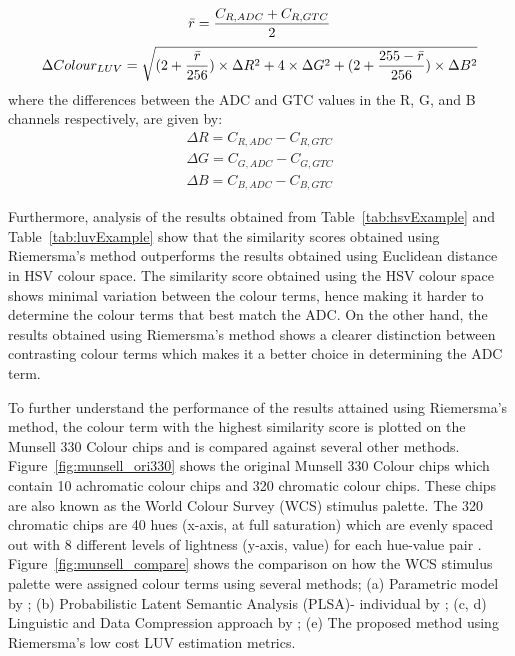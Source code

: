 \begin{equation}
\label{eq:RedMeanRGBDiff}
\bar{r} = \frac{C_{R,ADC} + C_{R,GTC}}{2}
\end{equation}
\begin{equation}
\label{eq:DiffColorLUV}
\Delta Colour_{LUV} = \sqrt{(2 + \frac{\bar{r}}{256}) \times \Delta R^{2} + 4 \times \Delta G^{2} + (2 + \frac{255 - \bar{r}}{256}) \times \Delta B^{2} }
\end{equation}
where the differences between the ADC and GTC values in the R, G, and B channels respectively, are given by:
\begin{align}
\Delta R = C_{R,ADC} - C_{R,GTC}\\
\Delta G = C_{G,ADC} - C_{G,GTC}\\
\Delta B = C_{B,ADC} - C_{B,GTC}
 \end{align}
 
Furthermore, analysis of the results obtained from Table~\ref{tab:hsvExample} and Table~\ref{tab:luvExample} show that the similarity scores obtained using Riemersma's method outperforms the results obtained using Euclidean distance in HSV colour space.
The similarity score obtained using the HSV colour space shows minimal variation between the colour terms, hence making it harder to determine the colour terms that best match the ADC.
On the other hand, the results obtained using Riemersma's method shows a clearer distinction between contrasting colour terms which makes it a better choice in determining the ADC term.

To further understand the performance of the results attained using Riemersma's method, the colour term with the highest similarity score is plotted on the Munsell 330 Colour chips and is compared against several other methods.
Figure~\ref{fig:munsell_ori330} shows the original Munsell 330 Colour chips which contain 10 achromatic colour chips and 320 chromatic colour chips.
These chips are also known as the World Colour Survey (WCS) stimulus palette.
The 320 chromatic chips are 40 hues (x-axis, at full saturation) which are evenly spaced out with 8 different levels of lightness (y-axis, value) for each hue-value pair \cite{kay2009world}.
Figure~\ref{fig:munsell_compare} shows the comparison on how the WCS stimulus palette were assigned colour terms using several methods; (a) Parametric model by ; (b) Probabilistic Latent Semantic Analysis (PLSA)- individual by ; (c, d) Linguistic and Data Compression approach by ; (e) The proposed method using Riemersma's low cost LUV estimation metrics.

